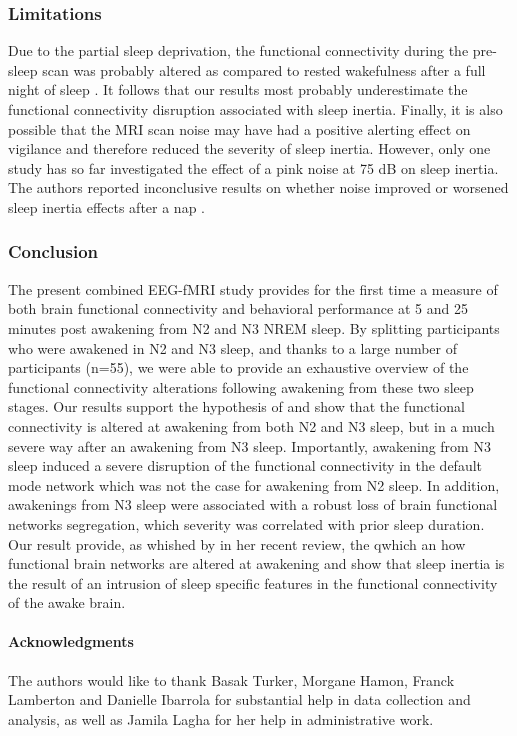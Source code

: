 \subsubsection*{Limitations}
Due to the partial sleep deprivation, the functional connectivity during the pre-sleep scan was probably altered as compared to rested wakefulness after a full night of sleep \citep{samann_increased_2010, de_havas_sleep_2012, yeo_functional_2015, kaufmann_brain_2015, tushaus_resisting_2017}. It follows that our results most probably underestimate the functional connectivity disruption associated with sleep inertia. Finally, it is also possible that the MRI scan noise may have had a positive alerting effect on vigilance and therefore reduced the severity of sleep inertia. However, only one study has so far investigated the effect of a pink noise at 75 dB on sleep inertia. The authors reported inconclusive results on whether noise improved or worsened sleep inertia effects after a nap \citep{tassi_effects_1992}.

\subsubsection*{Conclusion}
The present combined EEG-fMRI study provides for the first time a measure of both brain functional connectivity and behavioral performance at 5 and 25 minutes post awakening from N2 and N3 NREM sleep. By splitting participants who were awakened in N2 and N3 sleep, and thanks to a large number of participants (n=55), we were able to provide an exhaustive overview of the functional connectivity alterations following awakening from these two sleep stages. Our results support the hypothesis of \citet{balkin_process_2002} and show that the functional connectivity is altered at awakening from both N2 and N3 sleep, but in a much severe way after an awakening from N3 sleep. Importantly, awakening from N3 sleep induced a severe disruption of the functional connectivity in the default mode network which was not the case for awakening from N2 sleep. In addition, awakenings from N3 sleep were associated with a robust loss of brain functional networks segregation, which severity was correlated with prior sleep duration. Our result provide, as whished by \citet{trotti_waking_2016} in her recent review, the q{which an how} functional brain networks are altered at awakening and show that sleep inertia is the result of an intrusion of sleep specific features in the functional connectivity of the awake brain.

\paragraph{Acknowledgments}
The authors would like to thank Basak Turker, Morgane Hamon, Franck Lamberton and Danielle Ibarrola for substantial help in data collection and analysis, as well as Jamila Lagha for her help in administrative work.


